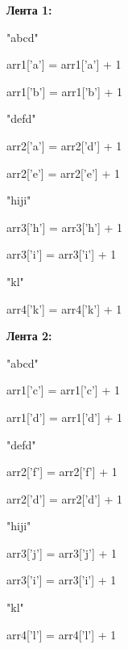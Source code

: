 \documentclass[12pt]{report}
\begin{document}
\begin{center}
	\textbf{Лента 1:}
	
	\vspace{\baselineskip}
	
	"abcd"
	
	arr1['a'] = arr1['a'] + 1
	
	arr1['b'] = arr1['b'] + 1
	
	\vspace{\baselineskip}
	
	"defd"
	
	arr2['a'] = arr2['d'] + 1
	
	arr2['e'] = arr2['e'] + 1
	
	\vspace{\baselineskip}
	\vspace{\baselineskip}
	
	"hiji"
	
	arr3['h'] = arr3['h'] + 1
	
	arr3['i'] = arr3['i'] + 1
	
	\vspace{\baselineskip}

	"kl"
	
	arr4['k'] = arr4['k'] + 1
	
	\vspace{\baselineskip}
	
	\textbf{Лента 2:}
	
	\vspace{\baselineskip}
	
	"abcd"
	
	arr1['c'] = arr1['c'] + 1
	
	arr1['d'] = arr1['d'] + 1
	
	\vspace{\baselineskip}
	
	"defd"
	
	arr2['f'] = arr2['f'] + 1
	
	arr2['d'] = arr2['d'] + 1
	
	\vspace{\baselineskip}
	
	"hiji"
	
	arr3['j'] = arr3['j'] + 1
	
	arr3['i'] = arr3['i'] + 1
	
	\vspace{\baselineskip}
	
	"kl"
	
	arr4['l'] = arr4['l'] + 1
\end{center}
\end{document}
